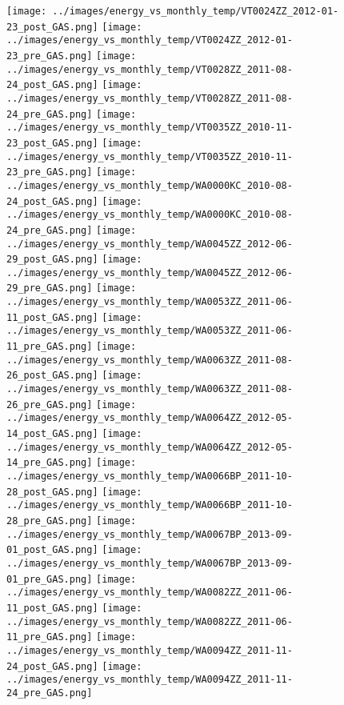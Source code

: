 \clearpage
\begin{figure}
\centering
\texttt{[image: ../images/energy\_vs\_monthly\_temp/VT0024ZZ\_2012-01-23\_post\_GAS.png]}
\texttt{[image: ../images/energy\_vs\_monthly\_temp/VT0024ZZ\_2012-01-23\_pre\_GAS.png]}
\texttt{[image: ../images/energy\_vs\_monthly\_temp/VT0028ZZ\_2011-08-24\_post\_GAS.png]}
\texttt{[image: ../images/energy\_vs\_monthly\_temp/VT0028ZZ\_2011-08-24\_pre\_GAS.png]}
\texttt{[image: ../images/energy\_vs\_monthly\_temp/VT0035ZZ\_2010-11-23\_post\_GAS.png]}
\texttt{[image: ../images/energy\_vs\_monthly\_temp/VT0035ZZ\_2010-11-23\_pre\_GAS.png]}
\texttt{[image: ../images/energy\_vs\_monthly\_temp/WA0000KC\_2010-08-24\_post\_GAS.png]}
\texttt{[image: ../images/energy\_vs\_monthly\_temp/WA0000KC\_2010-08-24\_pre\_GAS.png]}
\texttt{[image: ../images/energy\_vs\_monthly\_temp/WA0045ZZ\_2012-06-29\_post\_GAS.png]}
\texttt{[image: ../images/energy\_vs\_monthly\_temp/WA0045ZZ\_2012-06-29\_pre\_GAS.png]}
\texttt{[image: ../images/energy\_vs\_monthly\_temp/WA0053ZZ\_2011-06-11\_post\_GAS.png]}
\texttt{[image: ../images/energy\_vs\_monthly\_temp/WA0053ZZ\_2011-06-11\_pre\_GAS.png]}
\texttt{[image: ../images/energy\_vs\_monthly\_temp/WA0063ZZ\_2011-08-26\_post\_GAS.png]}
\texttt{[image: ../images/energy\_vs\_monthly\_temp/WA0063ZZ\_2011-08-26\_pre\_GAS.png]}
\texttt{[image: ../images/energy\_vs\_monthly\_temp/WA0064ZZ\_2012-05-14\_post\_GAS.png]}
\texttt{[image: ../images/energy\_vs\_monthly\_temp/WA0064ZZ\_2012-05-14\_pre\_GAS.png]}
\texttt{[image: ../images/energy\_vs\_monthly\_temp/WA0066BP\_2011-10-28\_post\_GAS.png]}
\texttt{[image: ../images/energy\_vs\_monthly\_temp/WA0066BP\_2011-10-28\_pre\_GAS.png]}
\texttt{[image: ../images/energy\_vs\_monthly\_temp/WA0067BP\_2013-09-01\_post\_GAS.png]}
\texttt{[image: ../images/energy\_vs\_monthly\_temp/WA0067BP\_2013-09-01\_pre\_GAS.png]}
\texttt{[image: ../images/energy\_vs\_monthly\_temp/WA0082ZZ\_2011-06-11\_post\_GAS.png]}
\texttt{[image: ../images/energy\_vs\_monthly\_temp/WA0082ZZ\_2011-06-11\_pre\_GAS.png]}
\texttt{[image: ../images/energy\_vs\_monthly\_temp/WA0094ZZ\_2011-11-24\_post\_GAS.png]}
\texttt{[image: ../images/energy\_vs\_monthly\_temp/WA0094ZZ\_2011-11-24\_pre\_GAS.png]}
\end{figure}
